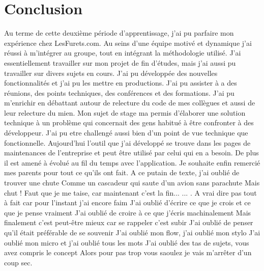 \chapter{Conclusion}

Au terme de cette deuxième période d'apprentissage, j'ai pu parfaire mon expérience chez LesFurets.com. Au seins d'une équipe motivé et dynamique j'ai réussi à m'intégrer au groupe, tout en intégrant la méthodologie utilisé. J'ai essentiellement travailler sur mon projet de fin d'études, mais j'ai aussi pu travailler sur divers sujets en cours. J'ai pu développée des nouvelles fonctionnalités  et j'ai pu les mettre en productions. J'ai pu assister à a des réunions, des points techniques, des conférences et des formations. J'ai pu m'enrichir en débattant autour de relecture du code de mes collègues et aussi de leur relecture du mien. Mon sujet de stage ma permis d'élaborer une solution technique à un problème qui concernait des gens habitué à être confronter à des développeur. J'ai pu etre challengé aussi bien d'un point de vue technique que fonctionnelle. Aujourd'hui l'outil que j'ai développé se trouve dans les pages de maintenances de l'entreprise et peut être utilisé par celui qui en a besoin. De plus il est amené à évolué au fil du temps avec l'application. Je souhaite enfin remercié mes parents pour tout ce qu'ils ont fait.
A ce putain de texte, j'ai oublié de trouver une chute 
Comme un cascadeur qui saute d'un avion sans parachute 
Mais chut ! Faut que je me taise, car maintenant c'est la fin... 
... . A vrai dire pas tout à  fait car pour l'instant j'ai encore faim 
J'ai oublié d'écrire ce que je crois et ce que je pense vraiment 
J'ai oublié de croire à  ce que j'écris machinalement 
Mais finalement c'est peut-être mieux car se rappeler c'est subir 
J'ai oublié de penser qu'il était préférable de se souvenir 
J'ai oublié mon flow, j'ai oublié mon stylo 
J'ai oublié mon micro et j'ai oublié tous les mots 
J'ai oublié des tas de sujets, vous avez compris le concept 
Alors pour pas trop vous saoulez je vais m'arrêter d'un coup sec.